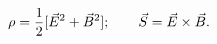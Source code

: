 \begin{equation}
\rho = {1\over2} [\vec E^2+\vec B^2];
\qquad
\vec S = \vec E \times \vec B.
\end{equation}

